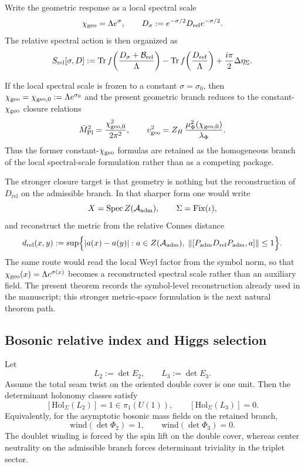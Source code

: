 \begin{definition}
\label{def:local-spectral-scale}
Write the geometric response as a local spectral scale
\[
\chi_{\mathrm{geo}}=\Lambda e^\sigma,
\qquad
D_\sigma:=e^{-\sigma/2}D_{\mathrm{rel}}e^{-\sigma/2}.
\]
The relative spectral action is then organized as
\[
S_{\mathrm{rel}}[\sigma,D]
:=
\operatorname{Tr} f\!\left(\frac{D_\sigma+\mathcal B_{\mathrm{rel}}}{\Lambda}\right)
-\operatorname{Tr} f\!\left(\frac{D_{\mathrm{ref}}}{\Lambda}\right)
+\frac{i\pi}{2}\Delta\eta_\Sigma.
\]
\end{definition}

\begin{corollary}
\label{cor:constant-scale-reduction}
If the local spectral scale is frozen to a constant $\sigma=\sigma_0$, then $\chi_{\mathrm{geo}}=\chi_{\mathrm{geo},0}:=\Lambda e^{\sigma_0}$ and the present geometric branch reduces to the constant-$\chi_{\mathrm{geo}}$ closure relations
\[
\bar M_{\mathrm{Pl}}^2=\frac{\chi_{\mathrm{geo},0}^2}{2\pi^2},
\qquad
v_{\mathrm{geo}}^2=Z_H\,\frac{\mu_\Phi^2(\chi_{\mathrm{geo},0})}{\lambda_\Phi}.
\]
Thus the former constant-$\chi_{\mathrm{geo}}$ formulas are retained as the homogeneous branch of the local spectral-scale formulation rather than as a competing package.
\end{corollary}

\begin{remark}
The stronger closure target is that geometry is nothing but the reconstruction of
$D_{\mathrm{rel}}$ on the admissible branch. In that sharper form one would write
\[
X=\operatorname{Spec} Z(\mathcal A_{\mathrm{adm}}),
\qquad
\Sigma=\operatorname{Fix}(\iota),
\]
and reconstruct the metric from the relative Connes distance
\[
d_{\mathrm{rel}}(x,y)
:=
\sup\Bigl\{
|a(x)-a(y)|:
a\in Z(\mathcal A_{\mathrm{adm}}),\;
\|[P_{\mathrm{adm}} D_{\mathrm{rel}}P_{\mathrm{adm}},a]\|\le 1
\Bigr\}.
\]
The same route would read the local Weyl factor from the symbol norm, so that
$\chi_{\mathrm{geo}}(x)=\Lambda e^{\sigma(x)}$ becomes a reconstructed spectral scale rather than
an auxiliary field. The present theorem records the symbol-level reconstruction
already used in the manuscript; this stronger metric-space formulation is the
next natural theorem path.
\end{remark}

\subsection{Bosonic relative index and Higgs selection}

\begin{theorem}
\label{thm:determinant-class-higgs-selection}
Let
\[
L_2:=\det E_2,
\qquad
L_3:=\det E_3.
\]
Assume the total seam twist on the oriented double cover is one unit. Then the determinant holonomy classes satisfy
\[
[\mathrm{Hol}_\Sigma(L_2)]=1\in\pi_1(U(1)),
\qquad
[\mathrm{Hol}_\Sigma(L_3)]=0.
\]
Equivalently, for the asymptotic bosonic mass fields on the retained branch,
\[
\mathrm{wind}(\det\Phi_2)=1,
\qquad
\mathrm{wind}(\det\Phi_3)=0.
\]
The doublet winding is forced by the spin lift on the double cover, whereas center neutrality on the admissible branch forces determinant triviality in the triplet sector.
\end{theorem}

